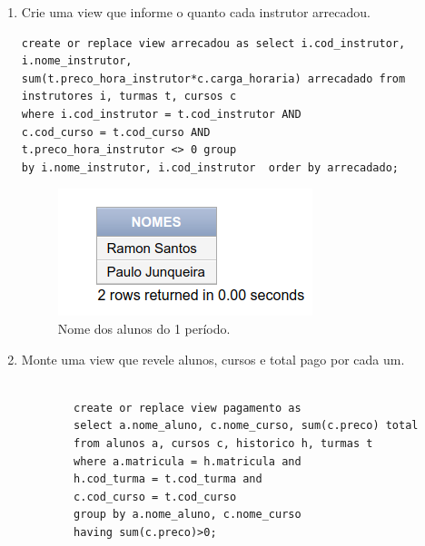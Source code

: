 \documentclass[
article,			%
11pt,				%
oneside,			%
a4paper,			%
english,			%
brazil,				%
sumario=tradicional
]{abntex2}
\begin{document}
	
	\frenchspacing 
	
	
	\maketitle
	\begin{enumerate}
		\item Crie uma view que informe o quanto cada instrutor
		arrecadou.
				\begin{verbatim}
create or replace view arrecadou as select i.cod_instrutor, i.nome_instrutor,
sum(t.preco_hora_instrutor*c.carga_horaria) arrecadado from
instrutores i, turmas t, cursos c 
where i.cod_instrutor = t.cod_instrutor AND
c.cod_curso = t.cod_curso AND
t.preco_hora_instrutor <> 0 group 
by i.nome_instrutor, i.cod_instrutor  order by arrecadado;
				\end{verbatim}
				
				\begin{center}
					\begin{figure}[H]
						\centering
						\includegraphics[scale=0.5]{./imagens/at-01.png}
						\caption{Nome dos alunos do 1 período.}
						\label{rota-1}
					\end{figure}
				\end{center}
			
						\item  Monte uma view que revele alunos, cursos e total
						pago por cada um.
						\begin{verbatim}

		create or replace view pagamento as
		select a.nome_aluno, c.nome_curso, sum(c.preco) total
		from alunos a, cursos c, historico h, turmas t
		where a.matricula = h.matricula and 
		h.cod_turma = t.cod_turma and
		c.cod_curso = t.cod_curso
		group by a.nome_aluno, c.nome_curso
		having sum(c.preco)>0;
						\end{verbatim}
						

\end{enumerate}
\end{document}
